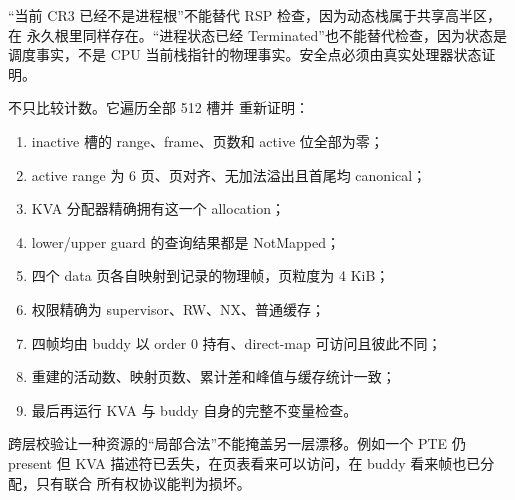 \begin{center}
\end{center}

“当前 CR3 已经不是进程根”不能替代 RSP 检查，因为动态栈属于共享高半区，在
永久根里同样存在。“进程状态已经 Terminated”也不能替代检查，因为状态是
调度事实，不是 CPU 当前栈指针的物理事实。安全点必须由真实处理器状态证明。

 不只比较计数。它遍历全部 512 槽并
重新证明：

\begin{enumerate}[label=\arabic*.]
  \item inactive 槽的 range、frame、页数和 active 位全部为零；
  \item active range 为 6 页、页对齐、无加法溢出且首尾均 canonical；
  \item KVA 分配器精确拥有这一个 allocation；
  \item lower/upper guard 的查询结果都是 NotMapped；
  \item 四个 data 页各自映射到记录的物理帧，页粒度为 4 KiB；
  \item 权限精确为 supervisor、RW、NX、普通缓存；
  \item 四帧均由 buddy 以 order 0 持有、direct-map 可访问且彼此不同；
  \item 重建的活动数、映射页数、累计差和峰值与缓存统计一致；
  \item 最后再运行 KVA 与 buddy 自身的完整不变量检查。
\end{enumerate}

跨层校验让一种资源的“局部合法”不能掩盖另一层漂移。例如一个 PTE 仍 present
但 KVA 描述符已丢失，在页表看来可以访问，在 buddy 看来帧也已分配，只有联合
所有权协议能判为损坏。

